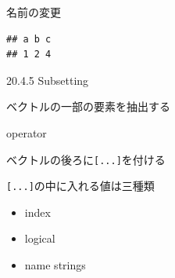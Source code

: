 \documentclass[ignorenonframetext,]{beamer}
\newenvironment{Shaded}{\begin{snugshade}}{\end{snugshade}}
\newcommand{\KeywordTok}[1]{\textcolor[rgb]{0.13,0.29,0.53}{\textbf{#1}}}
\newcommand{\StringTok}[1]{\textcolor[rgb]{0.31,0.60,0.02}{#1}}
\newcommand{\OperatorTok}[1]{\textcolor[rgb]{0.81,0.36,0.00}{\textbf{#1}}}
\newcommand{\NormalTok}[1]{#1}
\providecommand{\tightlist}{%
  \setlength{\itemsep}{0pt}\setlength{\parskip}{0pt}}
\begin{document}
\begin{frame}[fragile]{名前の変更}

\begin{Shaded}
\end{Shaded}

\begin{verbatim}
## a b c 
## 1 2 4
\end{verbatim}

\end{frame}

\begin{frame}[fragile]{20.4.5 Subsetting}

ベクトルの一部の要素を抽出する

\begin{block}{operator}

ベクトルの後ろに\texttt{{[}...{]}}を付ける

\texttt{{[}...{]}}の中に入れる値は三種類

\begin{itemize}
\tightlist
\item
  index
\item
  logical
\item
  name strings
\end{itemize}

\end{block}

\end{frame}
\end{document}
